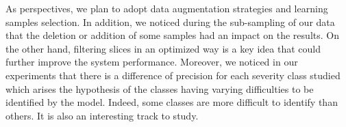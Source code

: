 \documentclass{llncs}
\begin{document}
As perspectives, we plan to adopt data augmentation strategies and learning samples selection. In addition, we noticed during the sub-sampling of our data that the deletion or addition of some samples had an impact on the results. On the other hand, filtering slices in an optimized way is a key idea that could further improve the system performance. Moreover, we noticed in our experiments that there is a difference of precision for each severity class studied which arises the hypothesis of the classes having varying difficulties to be identified by the model. Indeed,
some classes are more difficult to identify than others. It is also an interesting track to study.


\end{document}
